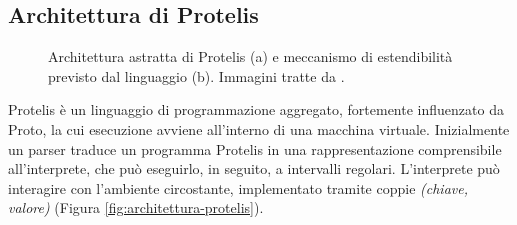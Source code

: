 \subsection{Architettura di Protelis}\label{subsec:Architettura di Protelis}
\begin{figure}
  \hfill
  \caption{Architettura astratta di Protelis (a) e meccanismo di estendibilità
    previsto dal linguaggio (b). Immagini tratte da \cite{Protelis}.}
\end{figure}

Protelis è un linguaggio di programmazione aggregato, fortemente influenzato da
Proto\cite{Proto}, la cui esecuzione avviene all'interno di una macchina
virtuale\cite{Protelis}.  Inizialmente un parser traduce un programma Protelis
in una rappresentazione comprensibile all'interprete, che può eseguirlo, in
seguito, a intervalli regolari. L'interprete può interagire con l'ambiente
circostante, implementato tramite coppie \textit{(chiave, valore)} (Figura
\ref{fig:architettura-protelis}).

